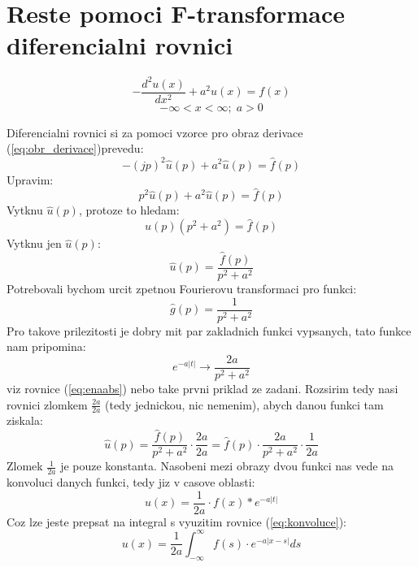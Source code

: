 \newpage

\section{Reste pomoci F-transformace diferencialni rovnici}
$$-\frac{d^2u(x)}{dx^2}+a^2u(x)=f(x)$$
$$-\infty<x<\infty; \; a>0$$

Diferencialni rovnici si za pomoci vzorce pro obraz derivace (\ref{eq:obr_derivace})prevedu:
$$-(jp)^2\hat{u}(p)+a^2 \hat{u}(p) = \hat{f}(p)$$
Upravim:
$$p^2\hat{u}(p)+a^2 \hat{u}(p) = \hat{f}(p)$$
Vytknu $\hat{u}(p)$, protoze to hledam:
$$\hat{u}(p)(p^2+a^2)=\hat{f}(p)$$
Vytknu jen $\hat{u}(p)$:
$$\hat{u}(p)=\frac{\hat{f}(p)}{p^2+a^2}$$
Potrebovali bychom urcit zpetnou Fourierovu transformaci pro funkci:
$$\hat{g}(p)=\frac{1}{p^2+a^2}$$
Pro takove prilezitosti je dobry mit par zakladnich funkci vypsanych, tato funkce nam pripomina:
$$e^{-a|t|} \to \frac{2a}{p^2+a^2}$$
viz rovnice (\ref{eq:enaabs}) nebo take prvni priklad ze zadani.
Rozsirim tedy nasi rovnici zlomkem $\frac{2a}{2a}$ (tedy jednickou, nic nemenim), abych danou funkci tam ziskala:
$$\hat{u}(p)=\frac{\hat{f}(p)}{p^2+a^2}\cdot \frac{2a}{2a} = \hat{f}(p) \cdot \frac{2a}{p^2+a^2} \cdot \frac{1}{2a}$$
Zlomek $\frac{1}{2a}$ je pouze konstanta. Nasobeni mezi obrazy dvou funkci nas vede na konvoluci danych funkci, tedy jiz v casove oblasti:
$$u(x) = \frac{1}{2a}\cdot f(x)*e^{-a|t|}$$
Coz lze jeste prepsat na integral s vyuzitim rovnice (\ref{eq:konvoluce}):
$$u(x) = \frac{1}{2a} \int_{-\infty}^\infty f(s)\cdot e^{-a|x-s|}ds$$




